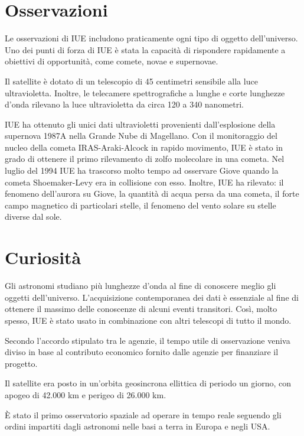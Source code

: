 \documentclass[12pt,a4paper]{article}
\begin{document}
\section*{Osservazioni}
\label{osservazioni}

Le osservazioni di IUE includono praticamente ogni tipo di oggetto dell'universo. Uno dei punti di forza di IUE è stata la capacità di rispondere rapidamente a obiettivi di opportunità, come comete, novae e supernovae.

Il satellite è dotato di un telescopio di 45 centimetri sensibile alla luce ultravioletta. Inoltre, le telecamere spettrografiche a lunghe e corte lunghezze d'onda rilevano la luce ultravioletta da circa 120 a 340 nanometri.

IUE ha ottenuto gli unici dati ultravioletti provenienti dall'esplosione della supernova 1987A nella Grande Nube di Magellano.
Con il monitoraggio del nucleo della cometa IRAS-Araki-Alcock in rapido movimento, IUE è stato in grado di ottenere il primo rilevamento di zolfo molecolare in una cometa.
Nel luglio del 1994 IUE ha trascorso molto tempo ad osservare Giove quando la cometa Shoemaker-Levy era in collisione con esso.
Inoltre, IUE ha rilevato: il fenomeno dell'aurora su Giove, la quantità di acqua persa da una cometa, il forte campo magnetico di particolari stelle, il fenomeno del vento solare su stelle diverse dal sole.

\section*{Curiosità}
\label{curiosit}

Gli astronomi studiano più lunghezze d'onda al fine di conoscere meglio gli oggetti dell'universo. L'acquisizione contemporanea dei dati è essenziale al fine di ottenere il massimo delle conoscenze di alcuni eventi transitori. Così, molto spesso, IUE è stato usato in combinazione con altri telescopi di tutto il mondo.

Secondo l'accordo stipulato tra le agenzie, il tempo utile di osservazione veniva diviso in base al contributo economico fornito dalle agenzie per finanziare il progetto.

Il satellite era posto in un'orbita geosincrona ellittica di periodo un giorno, con apogeo di 42.000 km e perigeo di 26.000 km.

È stato il primo osservatorio spaziale ad operare in tempo reale seguendo gli ordini impartiti dagli astronomi nelle basi a terra in Europa e negli USA.
\end{document}
